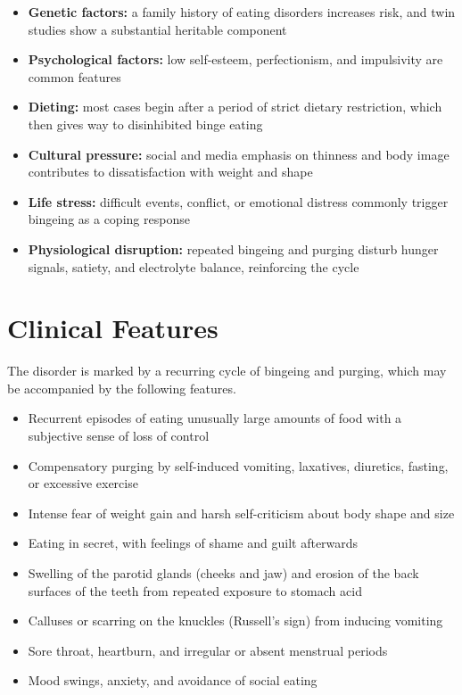 \begin{itemize}
    \item \textbf{Genetic factors:} a family history of eating disorders increases risk, and twin studies show a substantial heritable component
    \item \textbf{Psychological factors:} low self-esteem, perfectionism, and impulsivity are common features
    \item \textbf{Dieting:} most cases begin after a period of strict dietary restriction, which then gives way to disinhibited binge eating
    \item \textbf{Cultural pressure:} social and media emphasis on thinness and body image contributes to dissatisfaction with weight and shape
    \item \textbf{Life stress:} difficult events, conflict, or emotional distress commonly trigger bingeing as a coping response
    \item \textbf{Physiological disruption:} repeated bingeing and purging disturb hunger signals, satiety, and electrolyte balance, reinforcing the cycle
\end{itemize}

\section*{Clinical Features}
The disorder is marked by a recurring cycle of bingeing and purging, which may be accompanied by the following features.

\begin{itemize}
    \item Recurrent episodes of eating unusually large amounts of food with a subjective sense of loss of control
    \item Compensatory purging by self-induced vomiting, laxatives, diuretics, fasting, or excessive exercise
    \item Intense fear of weight gain and harsh self-criticism about body shape and size
    \item Eating in secret, with feelings of shame and guilt afterwards
    \item Swelling of the parotid glands (cheeks and jaw) and erosion of the back surfaces of the teeth from repeated exposure to stomach acid
    \item Calluses or scarring on the knuckles (Russell's sign) from inducing vomiting
    \item Sore throat, heartburn, and irregular or absent menstrual periods
    \item Mood swings, anxiety, and avoidance of social eating
\end{itemize}

